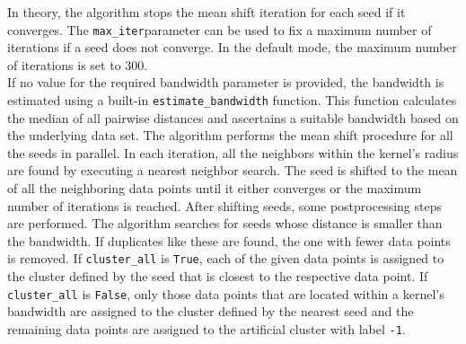 In theory, the algorithm stops the mean shift iteration for each seed if it converges. The \texttt{max_iter}parameter can be used to fix a maximum number of iterations if a seed does not converge. In the default mode, the maximum number of iterations is set to 300.\\
If no value for the required bandwidth parameter is provided, the bandwidth is estimated using a built-in \texttt{estimate_bandwidth} function. This function calculates the median of all pairwise distances and ascertains a suitable bandwidth based on the underlying data set.\newline
The algorithm performs the mean shift procedure for all the seeds in parallel. In each iteration, all the neighbors within the kernel's radius are found by executing a nearest neighbor search. The seed is shifted to the mean of all the neighboring data points until it either converges or the maximum number of iterations is reached. 
After shifting seeds, some postprocessing steps are performed. The algorithm searches for seeds whose distance is smaller than the bandwidth. If duplicates like these are found, the one with fewer data points is removed. If \texttt{cluster_all} is \texttt{True}, each of the given data points is assigned to the cluster defined by the seed that is closest to the respective data point. If \texttt{cluster_all} is \texttt{False}, only those data points that are located within a kernel's bandwidth are assigned to the cluster defined by the nearest seed and the remaining data points are assigned to the artificial cluster with label \texttt{-1}.
